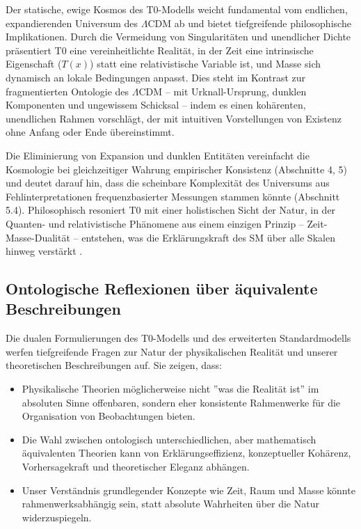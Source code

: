 \documentclass[twocolumn,aps,prl]{revtex4-2}
\newcommand{\Tfield}{T(x)}
\begin{document}
	Der statische, ewige Kosmos des T0-Modells weicht fundamental vom endlichen, expandierenden Universum des \(\Lambda\)CDM ab und bietet tiefgreifende philosophische Implikationen. Durch die Vermeidung von Singularitäten und unendlicher Dichte präsentiert T0 eine vereinheitlichte Realität, in der Zeit eine intrinsische Eigenschaft (\(\Tfield\)) statt eine relativistische Variable ist, und Masse sich dynamisch an lokale Bedingungen anpasst. Dies steht im Kontrast zur fragmentierten Ontologie des \(\Lambda\)CDM – mit Urknall-Ursprung, dunklen Komponenten und ungewissem Schicksal – indem es einen kohärenten, unendlichen Rahmen vorschlägt, der mit intuitiven Vorstellungen von Existenz ohne Anfang oder Ende übereinstimmt.
	
	Die Eliminierung von Expansion und dunklen Entitäten vereinfacht die Kosmologie bei gleichzeitiger Wahrung empirischer Konsistenz (Abschnitte 4, 5) und deutet darauf hin, dass die scheinbare Komplexität des Universums aus Fehlinterpretationen frequenzbasierter Messungen stammen könnte (Abschnitt 5.4). Philosophisch resoniert T0 mit einer holistischen Sicht der Natur, in der Quanten- und relativistische Phänomene aus einem einzigen Prinzip – Zeit-Masse-Dualität – entstehen, was die Erklärungskraft des SM über alle Skalen hinweg verstärkt \cite{pascher_perspective_2025}.
	
	\subsection{Ontologische Reflexionen über äquivalente Beschreibungen}
	\label{subsec:ontological_reflections}
	
	Die dualen Formulierungen des T0-Modells und des erweiterten Standardmodells werfen tiefgreifende Fragen zur Natur der physikalischen Realität und unserer theoretischen Beschreibungen auf. Sie zeigen, dass:
	
	\begin{itemize}
		\item Physikalische Theorien möglicherweise nicht ''was die Realität ist'' im absoluten Sinne offenbaren, sondern eher konsistente Rahmenwerke für die Organisation von Beobachtungen bieten.
		\item Die Wahl zwischen ontologisch unterschiedlichen, aber mathematisch äquivalenten Theorien kann von Erklärungseffizienz, konzeptueller Kohärenz, Vorhersagekraft und theoretischer Eleganz abhängen.
		\item Unser Verständnis grundlegender Konzepte wie Zeit, Raum und Masse könnte rahmenwerksabhängig sein, statt absolute Wahrheiten über die Natur widerzuspiegeln.
	\end{itemize}
	
\end{document}
